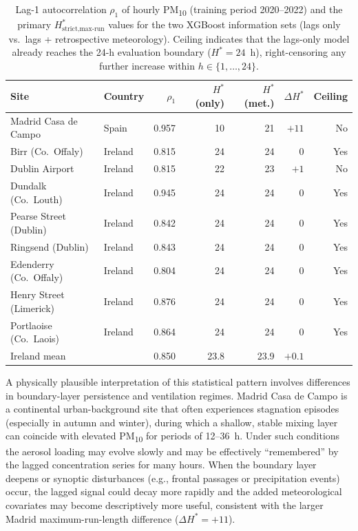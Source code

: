 \documentclass[12pt,a4paper]{article}
\newcommand{\PMten}{PM\textsubscript{10}}
\begin{document}
\begin{table}[htbp]
\centering
\caption{Lag-1 autocorrelation $\rho_1$ of hourly \PMten{} (training period
  2020--2022) and the primary $H^*_{\text{strict,max-run}}$ values for the two
  XGBoost information sets (lags only vs.\ lags + retrospective meteorology).
  Ceiling indicates that the lags-only model already reaches the 24-h
  evaluation boundary ($H^*=24$~h), right-censoring any further increase within
  $h\in\{1,\ldots,24\}$.}
\label{tab:rho1}
\small
\begin{tabular}{llrrrrr}
\toprule
Site & Country & $\rho_1$ & $H^*$ (only) & $H^*$ (met.) & $\Delta H^*$ & Ceiling \\
\midrule
Madrid Casa de Campo            & Spain   & 0.957 & 10  & 21  & $+11$ & No \\
Birr (Co.\ Offaly)              & Ireland & 0.815 & 24  & 24  & 0     & Yes \\
Dublin Airport                  & Ireland & 0.815 & 22  & 23  & $+1$  & No \\
Dundalk (Co.\ Louth)            & Ireland & 0.945 & 24  & 24  & 0     & Yes \\
Pearse Street (Dublin)          & Ireland & 0.842 & 24  & 24  & 0     & Yes \\
Ringsend (Dublin)               & Ireland & 0.843 & 24  & 24  & 0     & Yes \\
Edenderry (Co.\ Offaly)         & Ireland & 0.804 & 24  & 24  & 0     & Yes \\
Henry Street (Limerick)         & Ireland & 0.876 & 24  & 24  & 0     & Yes \\
Portlaoise (Co.\ Laois)         & Ireland & 0.864 & 24  & 24  & 0     & Yes \\
\midrule
Ireland mean                    &         & 0.850 & 23.8 & 23.9 & $+0.1$ & \\
\bottomrule

\end{tabular}
\end{table}

A physically plausible interpretation of this statistical pattern involves
differences in boundary-layer persistence and ventilation regimes.  Madrid Casa
de Campo is a continental urban-background site that often experiences
stagnation episodes (especially in autumn and winter), during which a shallow,
stable mixing layer can coincide with elevated \PMten{} for periods of
12--36~h.  Under such conditions the aerosol loading may evolve slowly and may
be effectively ``remembered'' by the lagged concentration series for many
hours.  When the boundary layer deepens or synoptic disturbances (e.g., frontal
passages or precipitation events) occur, the lagged signal could decay more
rapidly and the added meteorological covariates may become descriptively more
useful, consistent with the larger Madrid maximum-run-length difference
($\Delta H^*=+11$).
\end{document}
